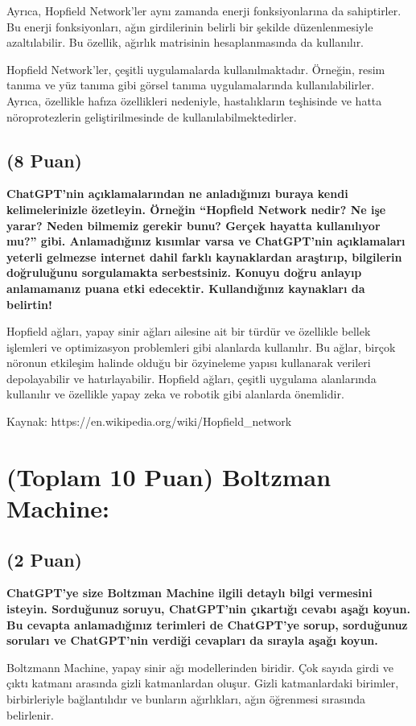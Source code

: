\documentclass[11pt]{article}
\begin{document}
Ayrıca, Hopfield Network'ler aynı zamanda enerji fonksiyonlarına da sahiptirler. Bu enerji fonksiyonları, ağın girdilerinin belirli bir şekilde düzenlenmesiyle azaltılabilir. Bu özellik, ağırlık matrisinin hesaplanmasında da kullanılır.

Hopfield Network'ler, çeşitli uygulamalarda kullanılmaktadır. Örneğin, resim tanıma ve yüz tanıma gibi görsel tanıma uygulamalarında kullanılabilirler. Ayrıca, özellikle hafıza özellikleri nedeniyle, hastalıkların teşhisinde ve hatta nöroprotezlerin geliştirilmesinde de kullanılabilmektedirler.

\subsection{(8 Puan)} \textbf{ChatGPT’nin açıklamalarından ne anladığınızı buraya kendi kelimelerinizle özetleyin. Örneğin ``Hopfield Network nedir? Ne işe yarar? Neden bilmemiz gerekir bunu? Gerçek hayatta kullanılıyor mu?'' gibi. Anlamadığınız kısımlar varsa ve ChatGPT’nin açıklamaları yeterli gelmezse internet dahil farklı kaynaklardan araştırıp, bilgilerin doğruluğunu sorgulamakta serbestsiniz. Konuyu doğru anlayıp anlamamanız puana etki edecektir. Kullandığınız kaynakları da belirtin!}

Hopfield ağları, yapay sinir ağları ailesine ait bir türdür ve özellikle bellek işlemleri ve optimizasyon problemleri gibi alanlarda kullanılır. Bu ağlar, birçok nöronun etkileşim halinde olduğu bir özyineleme yapısı kullanarak verileri depolayabilir ve hatırlayabilir. Hopfield ağları, çeşitli uygulama alanlarında kullanılır ve özellikle yapay zeka ve robotik gibi alanlarda önemlidir.

Kaynak: https://en.wikipedia.org/wiki/Hopfield_network

\section{(Toplam 10 Puan) Boltzman Machine:}

\subsection{(2 Puan)} \textbf{ChatGPT’ye size Boltzman Machine ilgili detaylı bilgi vermesini isteyin. Sorduğunuz soruyu, ChatGPT'nin çıkartığı cevabı aşağı koyun. Bu cevapta anlamadığınız terimleri de ChatGPT’ye sorup, sorduğunuz soruları ve ChatGPT’nin verdiği cevapları da sırayla aşağı koyun.}

Boltzmann Machine, yapay sinir ağı modellerinden biridir. Çok sayıda girdi ve çıktı katmanı arasında gizli katmanlardan oluşur. Gizli katmanlardaki birimler, birbirleriyle bağlantılıdır ve bunların ağırlıkları, ağın öğrenmesi sırasında belirlenir.
\end{document}
